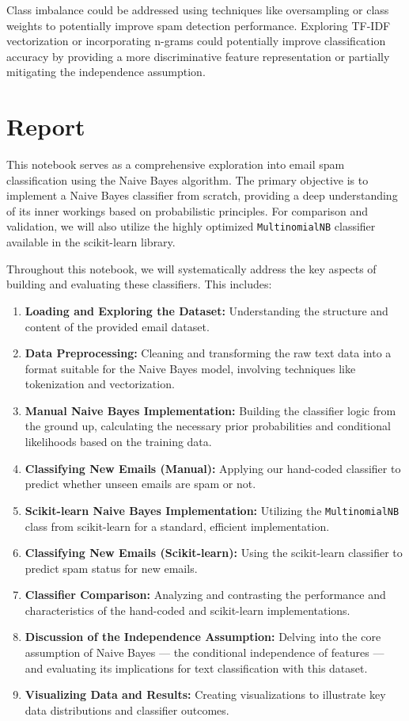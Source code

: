 \documentclass[12pt,letterpaper]{article}
\begin{document}
Class imbalance could be addressed using techniques like oversampling or class weights to potentially improve spam detection performance. Exploring TF-IDF vectorization or incorporating n-grams could potentially improve classification accuracy by providing a more discriminative feature representation or partially mitigating the independence assumption.

\section{Report}

This notebook serves as a comprehensive exploration into email spam classification using the Naive Bayes algorithm. The primary objective is to implement a Naive Bayes classifier from scratch, providing a deep understanding of its inner workings based on probabilistic principles. For comparison and validation, we will also utilize the highly optimized \texttt{MultinomialNB} classifier available in the scikit-learn library.

Throughout this notebook, we will systematically address the key aspects of building and evaluating these classifiers. This includes:

\begin{enumerate}
    \item \textbf{Loading and Exploring the Dataset:} Understanding the structure and content of the provided email dataset.
    \item \textbf{Data Preprocessing:} Cleaning and transforming the raw text data into a format suitable for the Naive Bayes model, involving techniques like tokenization and vectorization.
    \item \textbf{Manual Naive Bayes Implementation:} Building the classifier logic from the ground up, calculating the necessary prior probabilities and conditional likelihoods based on the training data.
    \item \textbf{Classifying New Emails (Manual):} Applying our hand-coded classifier to predict whether unseen emails are spam or not.
    \item \textbf{Scikit-learn Naive Bayes Implementation:} Utilizing the \texttt{MultinomialNB} class from scikit-learn for a standard, efficient implementation.
    \item \textbf{Classifying New Emails (Scikit-learn):} Using the scikit-learn classifier to predict spam status for new emails.
    \item \textbf{Classifier Comparison:} Analyzing and contrasting the performance and characteristics of the hand-coded and scikit-learn implementations.
    \item \textbf{Discussion of the Independence Assumption:} Delving into the core assumption of Naive Bayes --- the conditional independence of features --- and evaluating its implications for text classification with this dataset.
    \item \textbf{Visualizing Data and Results:} Creating visualizations to illustrate key data distributions and classifier outcomes.
\end{enumerate}
\end{document}
